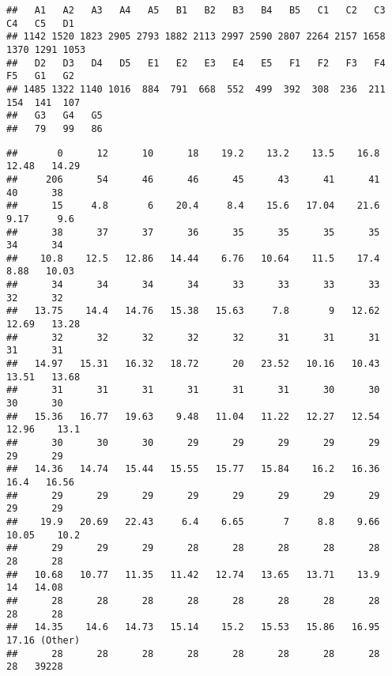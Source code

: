 \documentclass[
]{article}
\newenvironment{Shaded}{\begin{snugshade}}{\end{snugshade}}
\newcommand{\FunctionTok}[1]{\textcolor[rgb]{0.00,0.00,0.00}{#1}}
\newcommand{\NormalTok}[1]{#1}
\newcommand{\SpecialCharTok}[1]{\textcolor[rgb]{0.00,0.00,0.00}{#1}}
\begin{document}
\begin{verbatim}
##   A1   A2   A3   A4   A5   B1   B2   B3   B4   B5   C1   C2   C3   C4   C5   D1 
## 1142 1520 1823 2905 2793 1882 2113 2997 2590 2807 2264 2157 1658 1370 1291 1053 
##   D2   D3   D4   D5   E1   E2   E3   E4   E5   F1   F2   F3   F4   F5   G1   G2 
## 1485 1322 1140 1016  884  791  668  552  499  392  308  236  211  154  141  107 
##   G3   G4   G5 
##   79   99   86
\end{verbatim}

\begin{Shaded}
\end{Shaded}

\begin{verbatim}
##       0      12      10      18    19.2    13.2    13.5    16.8   12.48   14.29 
##     206      54      46      46      45      43      41      41      40      38 
##      15     4.8       6    20.4     8.4    15.6   17.04    21.6    9.17     9.6 
##      38      37      37      36      35      35      35      35      34      34 
##    10.8    12.5   12.86   14.44    6.76   10.64    11.5    17.4    8.88   10.03 
##      34      34      34      34      33      33      33      33      32      32 
##   13.75    14.4   14.76   15.38   15.63     7.8       9   12.62   12.69   13.28 
##      32      32      32      32      32      31      31      31      31      31 
##   14.97   15.31   16.32   18.72      20   23.52   10.16   10.43   13.51   13.68 
##      31      31      31      31      31      31      30      30      30      30 
##   15.36   16.77   19.63    9.48   11.04   11.22   12.27   12.54   12.96    13.1 
##      30      30      30      29      29      29      29      29      29      29 
##   14.36   14.74   15.44   15.55   15.77   15.84    16.2   16.36    16.4   16.56 
##      29      29      29      29      29      29      29      29      29      29 
##    19.9   20.69   22.43     6.4    6.65       7     8.8    9.66   10.05    10.2 
##      29      29      29      28      28      28      28      28      28      28 
##   10.68   10.77   11.35   11.42   12.74   13.65   13.71    13.9      14   14.08 
##      28      28      28      28      28      28      28      28      28      28 
##   14.35    14.6   14.73   15.14    15.2   15.53   15.86   16.95   17.16 (Other) 
##      28      28      28      28      28      28      28      28      28   39228
\end{verbatim}
\end{document}
